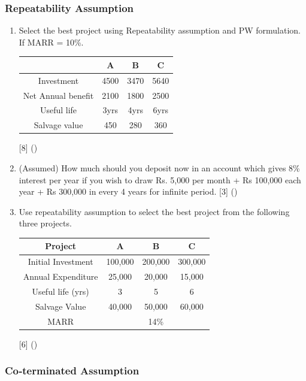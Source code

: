 \documentclass[12pt]{article}
\begin{document}
	\subsubsection{Repeatability Assumption}
	\begin{enumerate}[noitemsep, topsep=0pt]
		\item Select the best project using Repeatability assumption and PW formulation. If MARR = 10\%.\\
		\begin{tabular}{|c|c|c|c|}
			\hline
			& A & B & C \\ \hline
			Investment & 4500 & 3470 & 5640 \\ \hline
			Net Annual benefit & 2100 & 1800 & 2500 \\ \hline
			Useful life & 3yrs & 4yrs & 6yrs \\ \hline
			Salvage value & 450 & 280 & 360 \\ \hline
		\end{tabular}\hfill [8] ()
		
		\item (Assumed) How much should you deposit now in an account which gives 8\% interest per year if you wish to draw Rs. 5,000 per month + Rs 100,000 each year + Rs 300,000 in every 4 years for infinite period. \hfill [3] ()
		
		\item Use repeatability assumption to select the best project from the following three projects. \\
		\begin{tabular}{|c|c|c|c|}
			\hline
			Project & A & B & C \\ \hline
			Initial Investment & 100,000 & 200,000 & 300,000 \\ \hline
			Annual Expenditure & 25,000 & 20,000 & 15,000 \\ \hline
			Useful life (yrs) & 3 & 5 & 6 \\ \hline
			Salvage Value & 40,000 & 50,000 & 60,000 \\ \hline
			MARR & \multicolumn{3}{c|}{14\%} \\ \hline
		\end{tabular}\hfill [6] ()
	\end{enumerate}
	\subsubsection{Co‐terminated Assumption}
\end{document}
